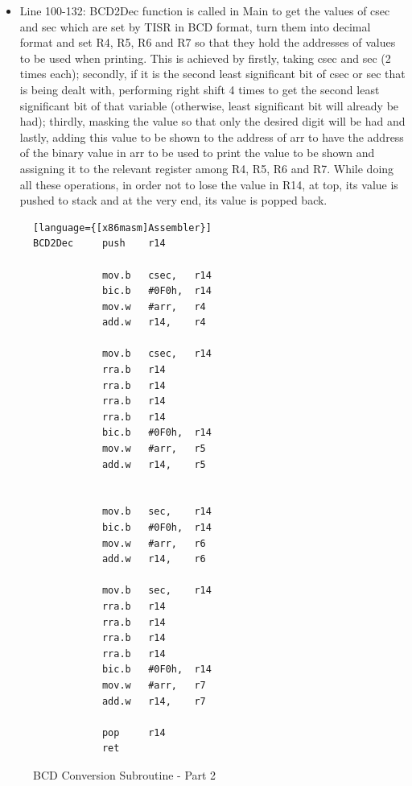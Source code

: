 \documentclass[pdftex,12pt,a4paper]{article}
\begin{document}
\begin{itemize}
    \item Line 100-132: BCD2Dec function is called in Main to get the values of csec and sec which are set by TISR in BCD format, turn them into decimal format and set R4, R5, R6 and R7 so that they hold the addresses of values to be used when printing.
    \newline
    This is achieved by firstly, taking csec and sec (2 times each); secondly, if it is the second least significant bit of csec or sec that is being dealt with, performing right shift 4 times to get the second least significant bit of that variable (otherwise, least significant bit will already be had); thirdly, masking the value so that only the desired digit will be had and lastly, adding this value to be shown to the address of arr to have the address of the binary value in arr to be used to print the value to be shown and assigning it to the relevant register among R4, R5, R6 and R7.
    \newline
    While doing all these operations, in order not to lose the value in R14, at top, its value is pushed to stack and at the very end, its value is popped back.
\end{itemize}
%
\begin{figure}[H]
    \centering
    \begin{lstlisting}[firstnumber=100][language={[x86masm]Assembler}]
BCD2Dec		push 	r14

			mov.b	csec,	r14
			bic.b	#0F0h,	r14
			mov.w	#arr,	r4
			add.w	r14,	r4

			mov.b	csec,	r14
			rra.b	r14
			rra.b	r14
			rra.b	r14
			rra.b	r14
			bic.b	#0F0h,	r14
			mov.w	#arr,	r5
			add.w	r14,	r5


			mov.b	sec,	r14
			bic.b	#0F0h,	r14
			mov.w	#arr,	r6
			add.w	r14,	r6

			mov.b	sec,	r14
			rra.b	r14
			rra.b	r14
			rra.b	r14
			rra.b	r14
			bic.b	#0F0h,	r14
			mov.w	#arr,	r7
			add.w	r14,	r7

			pop		r14
			ret

    \end{lstlisting}
    \label{code:part1delay}
    \caption{BCD Conversion Subroutine - Part 2}
\end{figure}
\end{document}

